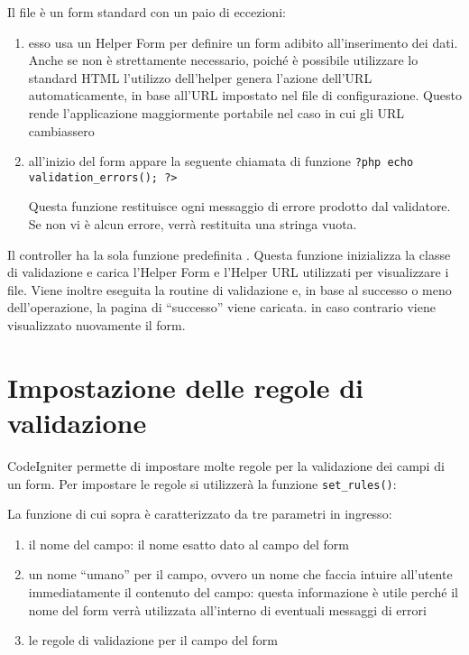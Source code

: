 Il file  è un form standard con un paio di eccezioni:

\begin{enumerate}
\item esso usa un Helper Form per definire un form adibito all'inserimento dei dati. Anche se non è strettamente necessario, poiché è possibile utilizzare lo standard \ac{HTML} l'utilizzo dell'helper genera l'azione dell'URL automaticamente, in base all'URL impostato nel file di configurazione. Questo rende l'applicazione maggiormente portabile nel caso in cui gli URL cambiassero
\item all'inizio del form appare la seguente chiamata di funzione \verb|?php echo validation_errors(); ?>|

Questa funzione restituisce ogni messaggio di errore prodotto dal validatore. Se non vi è alcun errore, verrà restituita una stringa vuota.
\end{enumerate}

Il controller  ha la sola funzione predefinita . Questa funzione inizializza la classe di validazione e carica l'Helper Form e l'Helper URL utilizzati per visualizzare i file. Viene inoltre eseguita la routine di validazione e, in base al successo o meno dell'operazione, la pagina di ``successo'' viene caricata. in caso contrario viene visualizzato nuovamente il form.

\section*{Impostazione delle regole di validazione}
CodeIgniter permette di impostare molte regole per la validazione dei campi di un form. Per impostare le regole si utilizzerà la funzione \verb|set_rules()|:


La funzione di cui sopra è caratterizzato da tre parametri in ingresso:

\begin{enumerate}
\item il nome del campo: il nome esatto dato al campo del form
\item un nome ``umano'' per il campo, ovvero un nome che faccia intuire all'utente immediatamente il contenuto del campo: questa informazione è utile perché il nome del form verrà utilizzata all'interno di eventuali messaggi di errori 
\item le regole di validazione per il campo del form
\end{enumerate}


